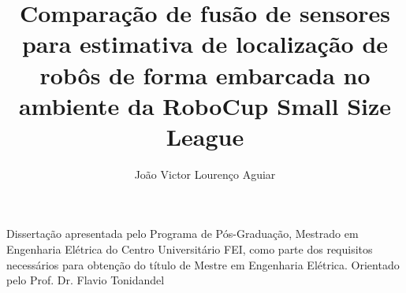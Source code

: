 \documentclass[acronym, symbols, table]{fei}
\title{Comparação de fusão de sensores para estimativa de localização de robôs de forma embarcada no ambiente da RoboCup Small Size League}
\author{João Victor Lourenço Aguiar}
\begin{document}
	
\maketitle

\begin{folhaderosto}
	Dissertação apresentada pelo Programa de Pós-Graduação, Mestrado em Engenharia Elétrica do Centro Universitário FEI, como parte dos requisitos necessários para obtenção do título de Mestre em Engenharia Elétrica. Orientado pelo Prof. Dr. Flavio Tonidandel
\end{folhaderosto}
	
\begin{resumo}
	



\end{resumo}
\end{document}
